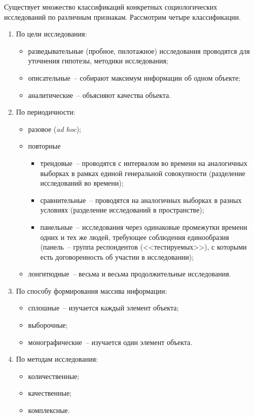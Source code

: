     Существует множество классификаций конкретных социологических исследований
    по различным признакам. Рассмотрим четыре классификации.
    \begin{enumerate}
      \item По цели исследования:
        \begin{itemize}
          \item разведывательные (пробное, пилотажное) исследования проводятся
            для уточнения гипотезы, методики исследования;
          \item описательные~-- собирают максимум информации об одном объекте;
          \item аналитические~-- объясняют качества объекта.
        \end{itemize}
      \item По периодичности:
        \begin{itemize}
          \item разовое (\emph{ad hoc});
          \item повторные
            \begin{itemize}
              \item трендовые~-- проводятся с интервалом во времени на
                аналогичных выборках в рамках единой генеральной совокупности
                (разделение исследований во времени);
              \item сравнительные~-- проводятся на аналогичных выборках в разных
                условиях (разделение исследований в пространстве);
              \item панельные~-- исследования через одинаковые промежутки
                времени одних и тех же людей, требующее соблюдения единообразия
                (панель~-- группа респондентов (<<тестируемых>>), с которыми
                есть договоренность об участии в исследовании);
            \end{itemize}
          \item лонгитюдные~-- весьма и весьма продолжительные исследования.
        \end{itemize}
      \item По способу формирования массива информации:
        \begin{itemize}
          \item сплошные~-- изучается каждый элемент объекта;
          \item выборочные;
          \item монографические~-- изучается один элемент объекта.
        \end{itemize}
      \item По методам исследования:
        \begin{itemize}
          \item количественные;
          \item качественные;
          \item комплексные.
        \end{itemize}
    \end{enumerate}

